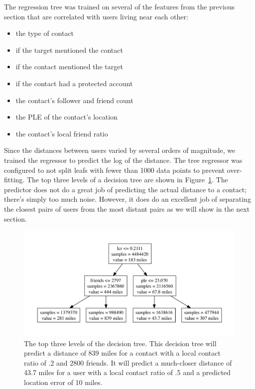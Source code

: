 The regression tree was trained on several of the features from the previous
section that are correlated with users living near each other:
\begin{itemize}
\item the type of contact
\item if the target mentioned the contact
\item if the contact mentioned the target
\item if the contact had a protected account
\item the contact's follower and friend count
\item the PLE of the contact's location
\item the contact's local friend ratio
\end{itemize}
%
Since the distances between users varied by several orders of magnitude, we
trained the regressor to predict the log of the distance.
%
The tree regressor was configured to not split leafs with fewer than 1000 data
points to prevent over-fitting.
%
The top three levels of a decision tree are shown in Figure~\ref{fig:TreeTop}.
%
The predictor does not do a great job of predicting the actual distance to a
contact; there's simply too much noise.
%
However, it does do an excellent job of separating the closest pairs of users
from the most distant pairs as we will show in the next section.

\begin{figure}[tbh]
\centering
\includegraphics[width=\linewidth]{figures/tree_top.pdf}
\caption{
    The top three levels of the decision tree. This decision tree will predict a
    distance of 839 miles for a contact with a local contact ratio of .2 and
    2800 friends. It will predict a much-closer distance of 43.7 miles for a
    user with a local contact ratio of .5 and a predicted location error of 10
    miles.
}
\label{fig:TreeTop}
\end{figure}

